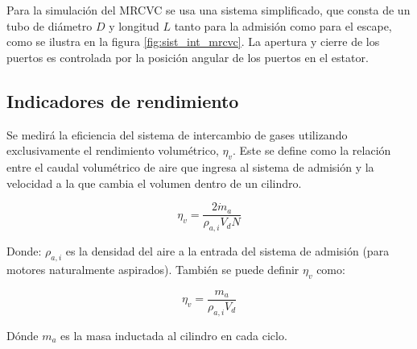 
Para la simulación del MRCVC se usa una sistema simplificado, que consta de un
tubo de diámetro $D$ y longitud $L$ tanto para la admisión como para el escape,
como se ilustra en la figura \ref{fig:sist_int_mrcvc}.
%
La apertura y cierre de los puertos es controlada por la posición angular de los
puertos en el estator.


\subsection{Indicadores de rendimiento}
\label{sec:indicadores_rendimiento}

Se medirá la eficiencia del sistema de intercambio de gases utilizando
exclusivamente el rendimiento volumétrico, $\eta_v$.
%
Este se define como la relación entre el caudal volumétrico de aire que ingresa
al sistema de admisión y la velocidad a la que cambia el volumen dentro de un
cilindro.


\begin{equation}
  \label{eq:rendVol}
  \eta_v = \frac{2 \dot{m}_a}{\rho_{a,i} V_d N}
\end{equation}

Donde: $\rho_{a,i}$ es la densidad del aire a la entrada del sistema de
admisión (para motores naturalmente aspirados). También se puede definir
$\eta_v$ como:

\begin{equation}
    \label{eq:rendVol2}
    \eta_v = \frac{m_a}{\rho_{a,i} V_d}
\end{equation}

Dónde $m_a$ es la masa inductada al cilindro en cada ciclo.

